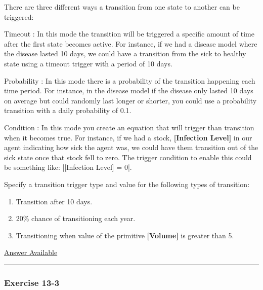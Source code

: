 \documentclass[]{memoir}
\newcommand{\DecValTok}[1]{\textcolor[rgb]{0.25,0.63,0.44}{{#1}}}
\newcommand{\NormalTok}[1]{{#1}}
\newcommand{\p}[1]{\textbf{{[}#1{]}}}
\begin{document}
There are three different ways a transition from one state to another
can be triggered:

Timeout : In this mode the transition will be triggered a specific
amount of time after the first state becomes active. For instance, if we
had a disease model where the disease lasted 10 days, we could have a
transition from the sick to healthy state using a timeout trigger with a
period of 10 days.

Probability : In this mode there is a probability of the transition
happening each time period. For instance, in the disease model if the
disease only lasted 10 days on average but could randomly last longer or
shorter, you could use a probability transition with a daily probability
of 0.1.

Condition : In this mode you create an equation that will trigger than
transition when it becomes true. For instance, if we had a stock,
\p{Infection Level} in our agent indicating how sick the agent was, we
could have them transition out of the sick state once that stock fell to
zero. The trigger condition to enable this could be something like:
|\NormalTok{[Infection Level] = }\DecValTok{0}|.


Specify a transition trigger type and value for the following types of
transition:

\begin{enumerate}
\def\labelenumi{\arabic{enumi}.}
\itemsep1pt\parskip0pt
\item
  Transition after 10 days.
\item
  20\% chance of transitioning each year.
\item
  Transitioning when value of the primitive \p{Volume} is greater than
  5.
\end{enumerate}

\hyperref[Ans-13-2]{Answer Available}

\begin{center}\rule{3in}{0.4pt}\end{center}

\subsubsection{Exercise 13-3}
\end{document}
